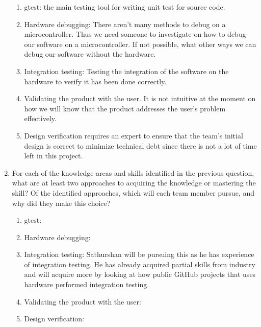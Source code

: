 \documentclass[12pt, titlepage]{article}
\begin{document}
\begin{enumerate}
  \begin{enumerate}
    \item gtest: the main testing tool for writing unit test for source code.
    \item Hardware debugging: There aren't many methods to debug on a
    microcontroller. Thus we need someone to investigate on how to debug our
    software on a microcontroller. If not possible, what other ways we can debug
    our software without the hardware.
    \item Integration testing: Testing the integration of the software on the
    hardware to verify it has been done correctly.
    \item Validating the product with the user. It is not intuitive at the
    moment on how we will know that the product addresses the user's problem
    effectively.
    \item Design verification requires an expert to ensure that the team's
    initial design is correct to minimize technical debt since there is not
    a lot of time left in this project.
  \end{enumerate}

  \item For each of the knowledge areas and skills identified in the previous
  question, what are at least two approaches to acquiring the knowledge or
  mastering the skill?  Of the identified approaches, which will each team
  member pursue, and why did they make this choice?

  \begin{enumerate}
    \item gtest:
    \item Hardware debugging: 
    \item Integration testing: Sathurshan will be pursuing this as he has
    experience of integration testing. He has already acquired partial skills
    from industry and will acquire more by looking at how public GitHub projects
    that uses hardware performed integration testing.
    \item Validating the product with the user:
    \item Design verification:
  \end{enumerate}
\end{enumerate}
\end{document}
